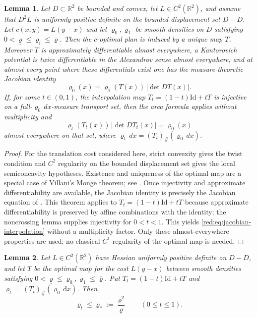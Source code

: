 \documentclass[11pt]{article}
\newtheorem{lemma}[lemma]{Lemma}
\theoremstyle{definition}
\theoremstyle{remark}
\numberwithin{equation}{section}
\newcommand{\R}{\mathbb R}
\newcommand{\dd}{\,\mathrm d}
\newcommand{\Id}{\mathrm{Id}}
\begin{document}
\begin{lemma}
\label{red:lem:jacobian-package}
Let $D\subset\R^2$ be bounded and convex, let $L\in C^2(\R^2)$, and assume
that $D^2L$ is uniformly positive definite on the bounded displacement set
$D-D$.  Let $c(x,y)=L(y-x)$ and let $\varrho_0,\varrho_1$ be smooth densities on
$D$ satisfying $0<\underline\varrho\le\varrho_i\le\overline\varrho$.  Then the $c$-optimal plan is induced
by a unique map $T$.  Moreover $T$ is approximately differentiable almost
everywhere, a Kantorovich potential is twice differentiable in the Alexandrov
sense almost everywhere, and at almost every point where these differentials
exist one has the measure-theoretic Jacobian identity
\begin{equation}
 \varrho_0(x)=\varrho_1(T(x))\,|\det DT(x)|.
 \label{red:eq:jacobian-map}
\end{equation}
If, for some $t\in(0,1)$, the interpolation map
$T_t=(1-t)\Id+tT$ is injective on a full-$\varrho_0\,dx$-measure transport set,
then the area formula applies without multiplicity and
\begin{equation}
 \varrho_t(T_t(x))\,|\det DT_t(x)|=\varrho_0(x)
 \label{red:eq:jacobian-interpolation}
\end{equation}
almost everywhere on that set, where
$\varrho_t\,dx=(T_t)_\#(\varrho_0\,dx)$.
\end{lemma}

\begin{proof}
For the translation cost considered here, strict convexity gives the twist
condition and $C^2$ regularity on the bounded displacement set gives the local
semiconcavity hypotheses.  Existence and uniqueness of the optimal map are a
special case of Villani's Monge theorem; see \cite[Thm.~10.28 and
Ex.~10.35]{Villani}.  Once injectivity and approximate
differentiability are available, the Jacobian identity is precisely the
Jacobian equation of \cite[Thm.~11.1]{Villani}.  This theorem applies to
$T_t=(1-t)\Id+tT$ because approximate differentiability is
preserved by affine combinations with the identity; the noncrossing lemma
supplies injectivity for $0<t<1$.  This yields
\eqref{red:eq:jacobian-interpolation} without a multiplicity factor.  Only
these almost-everywhere properties are used; no classical $C^1$ regularity
of the optimal map is needed.
\end{proof}

\begin{lemma}
\label{red:lem:density-interpolation}
Let $L\in C^2(\R^2)$ have Hessian uniformly positive definite on $D-D$,
and let $T$ be the optimal map for the cost $L(y-x)$ between smooth densities satisfying
$0<\underline\varrho\le\varrho_0,\varrho_1\le\overline\varrho$.  Put $T_t=(1-t)\Id+tT$ and
$\varrho_t=(T_t)_\#(\varrho_0\dd x)$.  Then
\begin{equation}
 \varrho_t\le \varrho_*:=\frac{\overline\varrho^2}{\underline\varrho}
 \qquad(0\le t\le1).
 \label{red:eq:rho-bound}
\end{equation}
\end{lemma}
\end{document}
